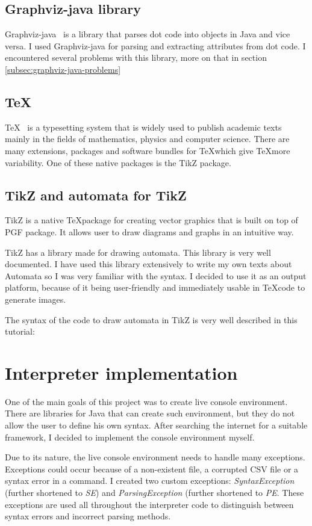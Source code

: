 \documentclass{ctuthesis}
\begin{document}
\subsection{Graphviz-java library}
Graphviz-java~\cite{graphviz-java} is a library that parses dot code into objects in Java and vice versa. I used Graphviz-java for parsing and extracting attributes from dot code. I encountered several problems with this library, more on that in section \ref{subsec:graphviz-java-problems}

\subsection{\TeX}
\TeX~\cite{tex} is a typesetting system that is widely used to publish academic texts mainly in the fields of mathematics, physics and computer science. There are many extensions, packages and software bundles for \TeX which give \TeX more variability. One of these native packages is the TikZ package.

\subsection{TikZ and automata for TikZ}
TikZ is a native \TeX package for creating vector graphics that is built on top of PGF package. It allows user to draw diagrams and graphs in an intuitive way.

TikZ has a library made for drawing automata. This library is very well documented. I have used this library extensively to write my own texts about Automata so I was very familiar with the syntax. I decided to use it as an output platform, because of it being user-friendly and immediately usable in \TeX code to generate images.

The syntax of the code to draw automata in TikZ is very well described in this tutorial:~\cite{tikz-tut}

\section{Interpreter implementation}
One of the main goals of this project was to create live console environment. There are libraries for Java that can create such environment, but they do not allow the user to define his own syntax. After searching the internet for a suitable framework, I decided to implement the console environment myself. 

Due to its nature, the live console environment needs to handle many exceptions. Exceptions could occur because of a non-existent file, a corrupted CSV file or a syntax error in a command. I created two custom exceptions: \textit{SyntaxException} (further shortened to \textit{SE}) and \textit{ParsingException} (further shortened to \textit{PE}. These exceptions are used all throughout the interpreter code to distinguish between syntax errors and incorrect parsing methods.
\end{document}
